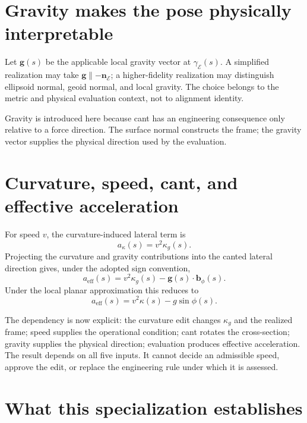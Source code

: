 \section{Gravity makes the pose physically interpretable}

Let \(\mathbf g(s)\) be the applicable local gravity vector at
\(\gamma_{\mathcal E}(s)\). A simplified realization may take
\(\mathbf g\parallel-\mathbf n_{\mathcal E}\); a higher-fidelity
realization may distinguish ellipsoid normal, geoid normal, and local
gravity. The choice belongs to the metric and physical evaluation
context, not to alignment identity.

Gravity is introduced here because cant has an engineering consequence
only relative to a force direction. The surface normal constructs the
frame; the gravity vector supplies the physical direction used by the
evaluation.

\section{Curvature, speed, cant, and effective acceleration}

For speed \(v\), the curvature-induced lateral term is
\[
a_{\kappa}(s)=v^2\kappa_g(s).
\]
Projecting the curvature and gravity contributions into the canted
lateral direction gives, under the adopted sign convention,
\[
a_{\mathrm{eff}}(s)
=v^2\kappa_g(s)
-\mathbf g(s)\cdot\mathbf b_{\phi}(s).
\]
Under the local planar approximation this reduces to
\[
a_{\mathrm{eff}}(s)
=v^2\kappa(s)-g\sin\phi(s).
\]

The dependency is now explicit: the curvature edit changes
\(\kappa_g\) and the realized frame; speed supplies the operational
condition; cant rotates the cross-section; gravity supplies the physical
direction; evaluation produces effective acceleration. The result
depends on all five inputs. It cannot decide an admissible speed, approve
the edit, or replace the engineering rule under which it is assessed.

\section{What this specialization establishes}


